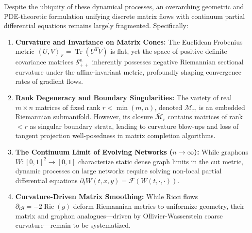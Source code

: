 \documentclass[11pt,a4paper,reqno]{amsart}
\theoremstyle{definition}
\numberwithin{equation}{section}
\newcommand{\Tr}{\operatorname{Tr}}
\newcommand{\Ric}{\operatorname{Ric}}
\newcommand{\inner}[2]{\left\langle #1, #2 \right\rangle}
\begin{document}
Despite the ubiquity of these dynamical processes, an overarching geometric and PDE-theoretic formulation unifying discrete matrix flows with continuum partial differential equations remains largely fragmented. Specifically:
\begin{enumerate}[label=(\alph*)]
    \item \textbf{Curvature and Invariance on Matrix Cones:} The Euclidean Frobenius metric $\inner{U}{V}_F = \Tr(U^T V)$ is flat, yet the space of positive definite covariance matrices $\mathcal{S}_{++}^n$ inherently possesses negative Riemannian sectional curvature under the affine-invariant metric, profoundly shaping convergence rates of gradient flows.
    \item \textbf{Rank Degeneracy and Boundary Singularities:} The variety of real $m \times n$ matrices of fixed rank $r < \min(m, n)$, denoted $\mathcal{M}_r$, is an embedded Riemannian submanifold. However, its closure $\overline{\mathcal{M}}_r$ contains matrices of rank $< r$ as singular boundary strata, leading to curvature blow-ups and loss of tangent projection well-posedness in matrix completion algorithms.
    \item \textbf{The Continuum Limit of Evolving Networks ($n \to \infty$):} While graphons $W \colon [0, 1]^2 \to [0, 1]$ characterize static dense graph limits in the cut metric, dynamic processes on large networks require solving non-local partial differential equations $\partial_t W(t, x, y) = \mathcal{F}(W(t, \cdot, \cdot))$.
    \item \textbf{Curvature-Driven Matrix Smoothing:} While Ricci flows $\partial_t g = -2 \Ric(g)$ deform Riemannian metrics to uniformize geometry, their matrix and graphon analogues---driven by Ollivier-Wasserstein coarse curvature---remain to be systematized.
\end{enumerate}
\end{document}
